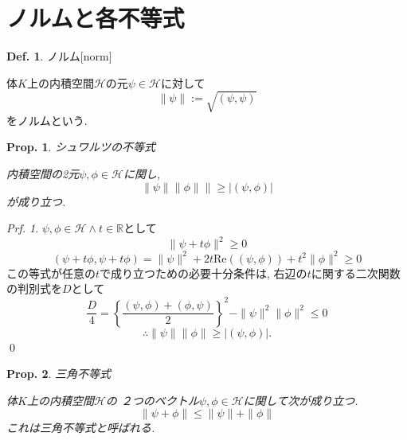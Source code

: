 \documentclass[a4paper,10pt,report]{amsart}
\theoremstyle{plain}
\newtheorem{prop}{Prop.}[section]
\theoremstyle{definition}
\newtheorem{defn}{Def.}[section]
\theoremstyle{remark}
\newtheorem{prf}{Prf.}
\begin{document}
\section{ノルムと各不等式}
\begin{leftbar}
    \begin{defn}ノルム[norm]\par
            体\(K\)上の内積空間\(\mathcal{H}\)の元\(\psi\in\mathcal{H}\)に対して
        \begin{equation}
            \|\psi{}\|:=\sqrt{(\psi,\psi)}
        \end{equation}
        をノルムという. 
    \end{defn}
\end{leftbar}
\begin{leftbar}
    \begin{prop}シュワルツの不等式\par
        内積空間の2元\(\psi,\phi\in\mathcal{H}\)に関し,
        \begin{equation}
            \|\psi{}\|{}\|\phi{}\|{}\|\geq|(\psi,\phi)|
        \end{equation}
        が成り立つ. 
    \end{prop}
\end{leftbar}
\begin{prf}
    \(\psi,\phi\in\mathcal{H}\wedge t\in \mathbb{R}\)として
    \begin{equation*}
        \|\psi+t\phi{}\|^{2}\geq 0
    \end{equation*}
    \begin{equation*}
        (\psi+t\phi,\psi+t\phi)=\|\psi{}\|^{2}+2t\mathrm{Re}((\psi,\phi))+t^{2}\|\phi{}\|^{2}\geq 0
    \end{equation*}
    この等式が任意の\(t\)で成り立つための必要十分条件は, 
    右辺の\(t\)に関する二次関数の判別式を\(D\)として
    \begin{equation*}
        \frac{D}{4}={\left \{\frac{(\psi,\phi)+(\phi,\psi)}{2}\right \}}^{2}-\|\psi{}\|^{2}\|\phi{}\|^{2}\leq 0
    \end{equation*}
    \begin{equation*}
        \therefore{}\|\psi{}\|{}\|\phi{}\|\geq|(\psi,\phi)|.
    \end{equation*}
    \qed{}
\end{prf}
\begin{leftbar}
    \begin{prop}三角不等式\par
        体\(K\)上の内積空間\(\mathcal{H}\)の
        ２つのベクトル\(\psi,\phi\in\mathcal{H}\)に関して次が成り立つ. 
        \begin{equation}
            \|\psi+\phi{}\|\leq{}\|\psi{}\|+\|\phi{}\|
        \end{equation}
        これは三角不等式と呼ばれる. 
    \end{prop}
\end{leftbar}
\end{document}
